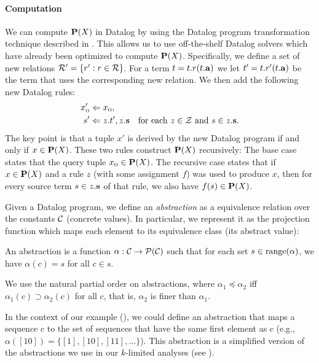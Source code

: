 \paragraph{Computation}

We can compute $\mathbf{P}(X)$ in Datalog by using the Datalog program transformation technique described in 
\cite{liang11minimal}.
This allows us to use off-the-shelf Datalog solvers which have already been optimized
to compute $\mathbf{P}(X)$.
Specifically, we define a set of new relations $\mathcal{R}' = \{ r' : r \in \mathcal{R} \}$.
For a term $t = t.r(t.\mathbf{a})$ we let $t' = t.r'(t.\mathbf{a})$ be the term that uses the corresponding new relation.
We then add the following new Datalog rules:
\begin{align}
x_\text{\sc o}' &\Leftarrow x_\text{\sc o}, \label{eqn:revBase} \\
s'   &\Leftarrow z.t', z.\mathbf{s} \quad \text{for each $z \in \mathcal{Z}$ and $s \in z.\mathbf{s}$.} \label{eqn:indBase}
\end{align}
The key point is that a tuple $x'$ is derived by the new Datalog program if and only if $x \in \mathbf{P}(X)$.
These two rules construct $\mathbf{P}(X)$ recursively:
The base case  states that the query tuple $x_\text{\sc o} \in \mathbf{P}(X)$.
The recursive case  states that if $x \in \mathbf{P}(X)$ and a rule $z$ (with some assignment $f$)
was used to produce $x$, then for every source term $s \in z.\mathbf{s}$ of that rule,
we also have $f(s) \in \mathbf{P}(X)$.


Given a Datalog program, we define an {\em abstraction} as a equivalence relation over
the constants $\mathcal{C}$ (concrete values).  In particular, we represent it as the projection
function which maps each element to its equivalence class (its abstract value):
\begin{definition}
\label{def:abstraction}
An abstraction is a function $\alpha : \mathcal{C} \to \mathcal{P}(\mathcal{C})$
such that for each set $s \in \text{range}(\alpha)$,
we have $\alpha(c) = s$ for all $c \in s$.
\end{definition}
We use the natural partial order on abstractions,
where $\alpha_1 \preceq \alpha_2$ iff $\alpha_1(c) \supset \alpha_2(c)$ for all $c$,
that is, $\alpha_2$ is finer than $\alpha_1$.

In the context of our example (),
we could define an abstraction
that maps a sequence $c$ to the set of sequences that have the same first element as $c$
(e.g., $\alpha([10]) = \{ [1], [10], [11], \dots \}$).
This abstraction is a simplified version of the abstractions we use in our
$k$-limited analyses (see ).

